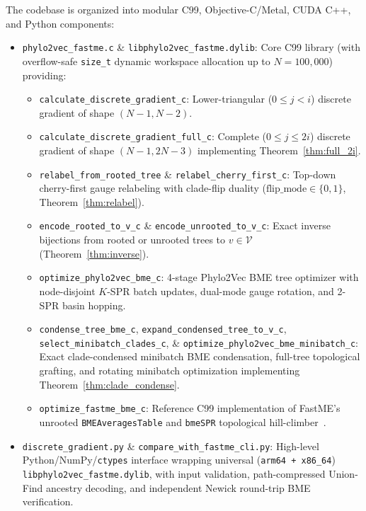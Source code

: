 \documentclass[11pt,a4paper]{article}
\theoremstyle{definition}
\begin{document}
The codebase is organized into modular C99, Objective-C/Metal, CUDA C++, and Python components:
\begin{itemize}
    \item \texttt{phylo2vec\_fastme.c} \& \texttt{libphylo2vec\_fastme.dylib}: Core C99 library (with overflow-safe \texttt{size\_t} dynamic workspace allocation up to $N = 100{,}000$) providing:
    \begin{itemize}
        \item \texttt{calculate\_discrete\_gradient\_c}: Lower-triangular ($0 \le j < i$) discrete gradient of shape $(N-1, N-2)$.
        \item \texttt{calculate\_discrete\_gradient\_full\_c}: Complete ($0 \le j \le 2i$) discrete gradient of shape $(N-1, 2N-3)$ implementing Theorem~\ref{thm:full_2i}.
        \item \texttt{relabel\_from\_rooted\_tree} \& \texttt{relabel\_cherry\_first\_c}: Top-down cherry-first gauge relabeling with clade-flip duality ($\text{flip\_mode} \in \{0, 1\}$, Theorem~\ref{thm:relabel}).
        \item \texttt{encode\_rooted\_to\_v\_c} \& \texttt{encode\_unrooted\_to\_v\_c}: Exact inverse bijections from rooted or unrooted trees to $v \in \mathcal{V}$ (Theorem~\ref{thm:inverse}).
        \item \texttt{optimize\_phylo2vec\_bme\_c}: 4-stage Phylo2Vec BME tree optimizer with node-disjoint $K$-SPR batch updates, dual-mode gauge rotation, and 2-SPR basin hopping.
        \item \texttt{condense\_tree\_bme\_c}, \texttt{expand\_condensed\_tree\_to\_v\_c}, \texttt{select\_minibatch\_clades\_c}, \& \texttt{optimize\_phylo2vec\_bme\_minibatch\_c}: Exact clade-condensed minibatch BME condensation, full-tree topological grafting, and rotating minibatch optimization implementing Theorem~\ref{thm:clade_condense}.
        \item \texttt{optimize\_fastme\_bme\_c}: Reference C99 implementation of FastME's unrooted \texttt{BMEAveragesTable} and \texttt{bmeSPR} topological hill-climber~\cite{desper2002fast,lefort2015fastme}.
    \end{itemize}
    \item \texttt{discrete\_gradient.py} \& \texttt{compare\_with\_fastme\_cli.py}: High-level Python/NumPy/\texttt{ctypes} interface wrapping universal (\texttt{arm64 + x86\_64}) \texttt{libphylo2vec\_fastme.dylib}, with input validation, path-compressed Union-Find ancestry decoding, and independent Newick round-trip BME verification.

\end{itemize}
\end{document}
